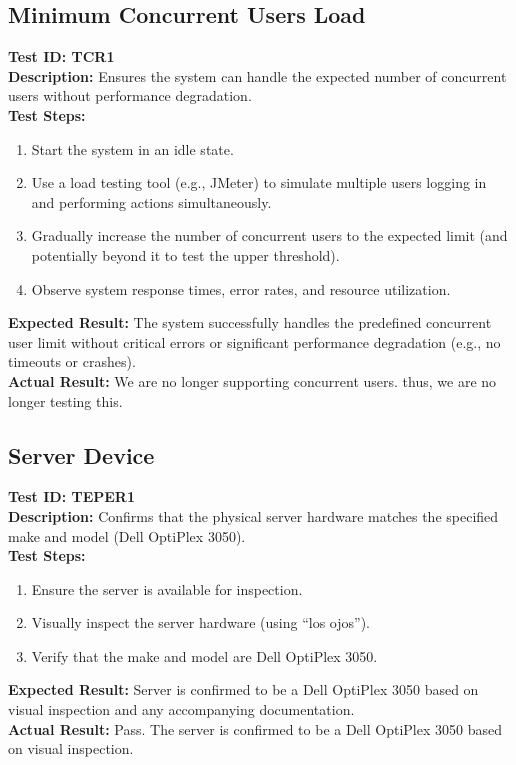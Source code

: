 \documentclass[12pt, titlepage]{article}
\begin{document}
\subsection{Minimum Concurrent Users Load}
\textbf{Test ID: TCR1}\\
\textbf{Description:} Ensures the system can handle the expected number of concurrent users without performance degradation.\\
\textbf{Test Steps:}
\begin{enumerate}
    \item Start the system in an idle state.
    \item Use a load testing tool (e.g., JMeter) to simulate multiple users logging in and performing actions simultaneously.
    \item Gradually increase the number of concurrent users to the expected limit (and potentially beyond it to test the upper threshold).
    \item Observe system response times, error rates, and resource utilization.
\end{enumerate}
\textbf{Expected Result:} The system successfully handles the predefined concurrent user limit without critical errors or significant performance degradation (e.g., no timeouts or crashes).\\
\textbf{Actual Result:} We are no longer supporting concurrent users. thus, we are no longer testing this.

\subsection{Server Device}
\textbf{Test ID: TEPER1}\\
\textbf{Description:} Confirms that the physical server hardware matches the specified make and model (Dell OptiPlex 3050).\\
\textbf{Test Steps:}
\begin{enumerate}
    \item Ensure the server is available for inspection.
    \item Visually inspect the server hardware (using ``los ojos'').
    \item Verify that the make and model are Dell OptiPlex 3050.
\end{enumerate}
\textbf{Expected Result:} Server is confirmed to be a Dell OptiPlex 3050 based on visual inspection and any accompanying documentation.\\
\textbf{Actual Result:} Pass. The server is confirmed to be a Dell OptiPlex 3050 based on visual inspection.
\end{document}
